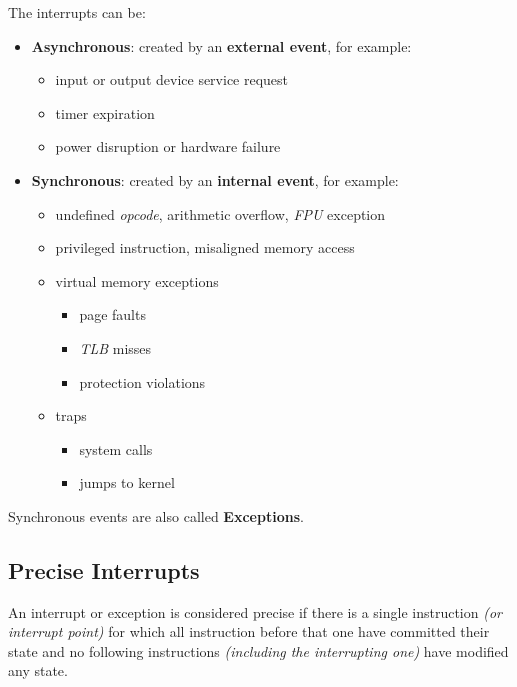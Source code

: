 \documentclass[english]{article}
\begin{document}
\begin{minipage}{0.99\textwidth}
  \bigskip
  The interrupts can be:
  \begin{itemize}
    \item \textbf{Asynchronous}: created by an \textbf{external event}, for example:
          \begin{itemize}
            \item input or output device service request
            \item timer expiration
            \item power disruption or hardware failure
          \end{itemize}
    \item \textbf{Synchronous}: created by an \textbf{internal event}, for example:
          \begin{itemize}
            \item undefined \textit{opcode}, arithmetic overflow, \textit{FPU} exception
            \item privileged instruction, misaligned memory access
            \item virtual memory exceptions
                  \begin{itemize}
                    \item page faults
                    \item \textit{TLB} misses
                    \item protection violations
                  \end{itemize}
            \item traps
                  \begin{itemize}
                    \item system calls
                    \item jumps to kernel
                  \end{itemize}
          \end{itemize}
  \end{itemize}
  \bigskip
\end{minipage}

Synchronous events are also called \textbf{Exceptions}.

\subsection{Precise Interrupts}

An interrupt or exception is considered precise if there is a single instruction \textit{(or interrupt point)} for which all instruction before that one have committed their state and no following instructions \textit{(including the interrupting one)} have modified any state.
\end{document}
